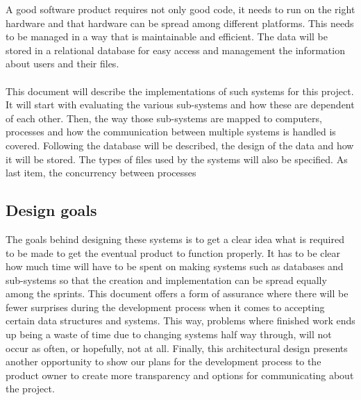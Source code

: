 A good software product requires not only good code, it needs to run on the right hardware and that hardware can be spread among different platforms. This needs to be managed in a way that is maintainable and efficient. The data will be stored in a relational database for easy access and management the information about users and their files.
\paragraph{}
This document will describe the implementations of such systems for this project. It will start with evaluating the various sub-systems and how these are dependent of each other. Then, the way those sub-systems are mapped to computers, processes and how the communication between multiple systems is handled is covered. 
Following the database will be described, the design of the data and how it will be stored. The types of files used by the systems will also be specified. 
As last item, the concurrency between processes 
\subsection{Design goals}
The goals behind designing these systems is to get a clear idea what is required to be made to get the eventual product to function properly. It has to be clear how much time will have to be spent on making systems such as databases and sub-systems so that the creation and implementation can be spread equally among the sprints. This document offers a form of assurance where there will be fewer surprises during the development process when it comes to accepting certain data structures and systems. This way, problems where finished work ends up being a waste of time due to changing systems half way through, will not occur as often, or hopefully, not at all.
Finally, this architectural design presents another opportunity to show our plans for the development process to the product owner to create more transparency and options for communicating about the project.


